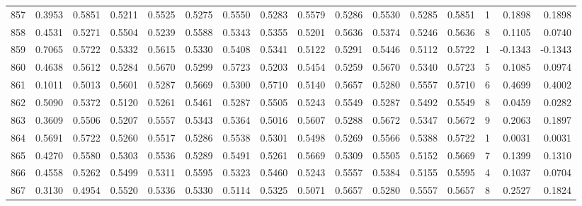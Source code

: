 \begin{tabular}{lrrrrrrrrrrrrrrr}
857 &      0.3953 &  0.5851 &  0.5211 &  0.5525 &  0.5275 &  0.5550 &  0.5283 &  0.5579 &  0.5286 &  0.5530 &   0.5285 &     0.5851 &      1 &                    0.1898 &                     0.1898 \\
858 &      0.4531 &  0.5271 &  0.5504 &  0.5239 &  0.5588 &  0.5343 &  0.5355 &  0.5201 &  0.5636 &  0.5374 &   0.5246 &     0.5636 &      8 &                    0.1105 &                     0.0740 \\
859 &      0.7065 &  0.5722 &  0.5332 &  0.5615 &  0.5330 &  0.5408 &  0.5341 &  0.5122 &  0.5291 &  0.5446 &   0.5112 &     0.5722 &      1 &                   -0.1343 &                    -0.1343 \\
860 &      0.4638 &  0.5612 &  0.5284 &  0.5670 &  0.5299 &  0.5723 &  0.5203 &  0.5454 &  0.5259 &  0.5670 &   0.5340 &     0.5723 &      5 &                    0.1085 &                     0.0974 \\
861 &      0.1011 &  0.5013 &  0.5601 &  0.5287 &  0.5669 &  0.5300 &  0.5710 &  0.5140 &  0.5657 &  0.5280 &   0.5557 &     0.5710 &      6 &                    0.4699 &                     0.4002 \\
862 &      0.5090 &  0.5372 &  0.5120 &  0.5261 &  0.5461 &  0.5287 &  0.5505 &  0.5243 &  0.5549 &  0.5287 &   0.5492 &     0.5549 &      8 &                    0.0459 &                     0.0282 \\
863 &      0.3609 &  0.5506 &  0.5207 &  0.5557 &  0.5343 &  0.5364 &  0.5016 &  0.5607 &  0.5288 &  0.5672 &   0.5347 &     0.5672 &      9 &                    0.2063 &                     0.1897 \\
864 &      0.5691 &  0.5722 &  0.5260 &  0.5517 &  0.5286 &  0.5538 &  0.5301 &  0.5498 &  0.5269 &  0.5566 &   0.5388 &     0.5722 &      1 &                    0.0031 &                     0.0031 \\
865 &      0.4270 &  0.5580 &  0.5303 &  0.5536 &  0.5289 &  0.5491 &  0.5261 &  0.5669 &  0.5309 &  0.5505 &   0.5152 &     0.5669 &      7 &                    0.1399 &                     0.1310 \\
866 &      0.4558 &  0.5262 &  0.5499 &  0.5311 &  0.5595 &  0.5323 &  0.5460 &  0.5243 &  0.5557 &  0.5384 &   0.5155 &     0.5595 &      4 &                    0.1037 &                     0.0704 \\
867 &      0.3130 &  0.4954 &  0.5520 &  0.5336 &  0.5330 &  0.5114 &  0.5325 &  0.5071 &  0.5657 &  0.5280 &   0.5557 &     0.5657 &      8 &                    0.2527 &                     0.1824 \\

\end{tabular}
